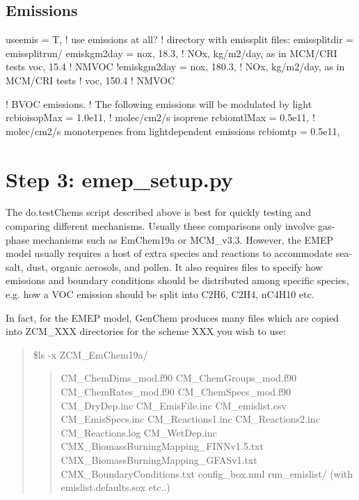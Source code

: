 \documentclass[a4paper,10pt,english]{sphinxmanual}
\begin{document}
\subsection{Emissions}
\label{\detokenize{GenChemDoc_quickstart:emissions}}
\begin{sphinxVerbatim}[commandchars=\\\{\}]
 use\PYGZus{}emis = T,     ! use emissions at all?
! directory with emissplit files:
 emissplit\PYGZus{}dir = \PYGZsq{}emissplit\PYGZus{}run/\PYGZsq{}
 emis\PYGZus{}kgm2day = \PYGZsq{}nox\PYGZsq{}, 18.3, ! NOx, kg/m2/day, as in MCM/CRI tests
                \PYGZsq{}voc\PYGZsq{}, 15.4  ! NMVOC
 !emis\PYGZus{}kgm2day = \PYGZsq{}nox\PYGZsq{}, 180.3, ! NOx, kg/m2/day, as in MCM/CRI tests
 !               \PYGZsq{}voc\PYGZsq{}, 150.4  ! NMVOC

 ! BVOC emissions.
 ! The following emissions will be modulated by light
 rcbio\PYGZus{}isopMax  = 1.0e11, ! molec/cm2/s  isoprene
 rcbio\PYGZus{}mtlMax   = 0.5e11, ! molec/cm2/s  monoterpenes from light\PYGZhy{}dependent emissions
 rcbio\PYGZus{}mtp      = 0.5e11,
\end{sphinxVerbatim}


\section{Step 3: emep\_setup.py}
\label{\detokenize{GenChemDoc_quickstart:step-3-emep-setup-py}}
The do.testChems script described above is best for quickly testing and
comparing different mechanisms. Usually these comparisons only involve
gas-phase mechanisms such as EmChem19a or MCM\_v3.3. However, the EMEP
model usually requires a host of extra species and reactions to
accommodate sea-salt, dust, organic aerosols, and pollen.
It also requires files to specify how emissions and boundary
conditions should be distributed among specific species, e.g.
how a VOC emission should be split into C2H6, C2H4, nC4H10 etc.

In fact, for the EMEP model, GenChem produces many files which are
copied into ZCM\_XXX directories for the scheme XXX you wish to use:
\begin{quote}

\$ls -x ZCM\_EmChem19a/
\begin{quote}

CM\_ChemDims\_mod.f90                     CM\_ChemGroups\_mod.f90
CM\_ChemRates\_mod.f90                    CM\_ChemSpecs\_mod.f90
CM\_DryDep.inc                           CM\_EmisFile.inc
CM\_emislist.csv                         CM\_EmisSpecs.inc
CM\_Reactions1.inc                       CM\_Reactions2.inc
CM\_Reactions.log                        CM\_WetDep.inc
CMX\_BiomassBurningMapping\_FINNv1.5.txt  CMX\_BiomassBurningMapping\_GFASv1.txt
CMX\_BoundaryConditions.txt              config\_box.nml
run\_emislist/  (with emislist.defaults.sox etc..)
\end{quote}
\end{quote}
\end{document}
